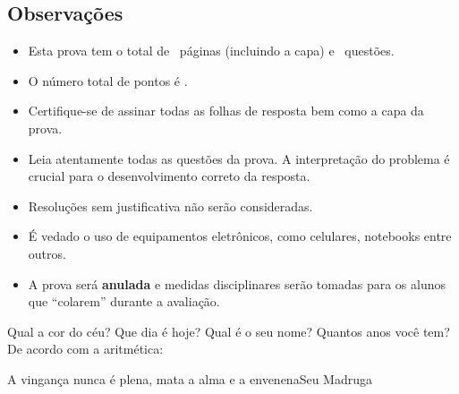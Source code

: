 \documentclass[12pt,addpoints,a4paper]{prova-ifb}
\begin{document}
\subsection*{Observações}
\begin{itemize}
	\item Esta prova tem o total de \numpages\ páginas (incluindo a capa) e \numquestions\ questões.
	\item O número total de pontos é \numpoints.
	\item Certifique-se de assinar todas as folhas de resposta bem como a capa da prova.
	\item Leia atentamente todas as questões da prova. A interpretação do problema é crucial para o desenvolvimento correto da resposta.
	\item Resoluções sem justificativa não serão consideradas.
	\item É vedado o uso de equipamentos eletrônicos, como celulares, notebooks entre outros.
	\item A prova será \textbf{anulada} e medidas disciplinares serão tomadas para os alunos que ``colarem'' durante a avaliação. 
	
\end{itemize}


\newpage

\begin{questions}
	
	\question[2] Qual a cor do céu?
	\question[2] Que dia é hoje?
	\question[2] Qual é o seu nome?
	\question[2] Quantos anos você tem?
	\question[2] De acordo com a aritmética:
	\begin{parts}
		\noaddpoints
		\part[1] 2+2?
		\part[1] 1+1?
		\addpoints
	\end{parts}
	\begin{citacao}{A vingança nunca é plena, mata a alma e a envenena}{Seu Madruga}
	\end{citacao}
\end{questions}
	
	
\end{document}
